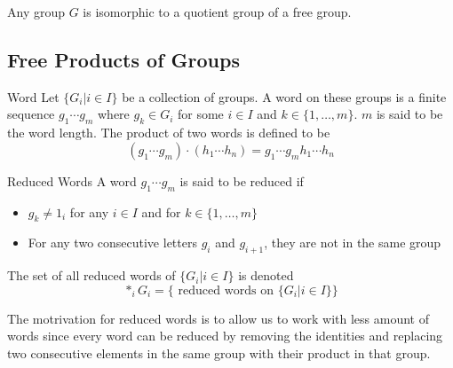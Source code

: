 \documentclass[a4paper]{article}
\begin{document}
\begin{prp}{}{} Any group $G$ is isomorphic to a quotient group of a free group. 
\end{prp}

\subsection{Free Products of Groups}
\begin{defn}{Word}{} Let $\{G_i|i\in I\}$ be a collection of groups. A word on these groups is a finite sequence $g_1\cdots g_m$ where $g_k\in G_i$ for some $i\in I$ and $k\in\{1,\dots,m\}$. $m$ is said to be the word length. The product of two words is defined to be $$(g_1\cdots g_m)\cdot(h_1\cdots h_n)=g_1\cdots g_mh_1\cdots h_n$$
\end{defn}

\begin{defn}{Reduced Words}{} A word $g_1\cdots g_m$ is said to be reduced if 
\begin{itemize}
\item $g_k\neq 1_i$ for any $i\in I$ and for $k\in\{1,\dots,m\}$
\item For any two consecutive letters $g_i$ and $g_{i+1}$, they are not in the same group
\end{itemize}
The set of all reduced words of $\{G_i|i\in I\}$ is denoted $$\ast_iG_i=\{\text{ reduced words on }\{G_i|i\in I\}\}$$
\end{defn}

The motrivation for reduced words is to allow us to work with less amount of words since every word can be reduced by removing the identities and replacing two consecutive elements in the same group with their product in that group. 
\end{document}
